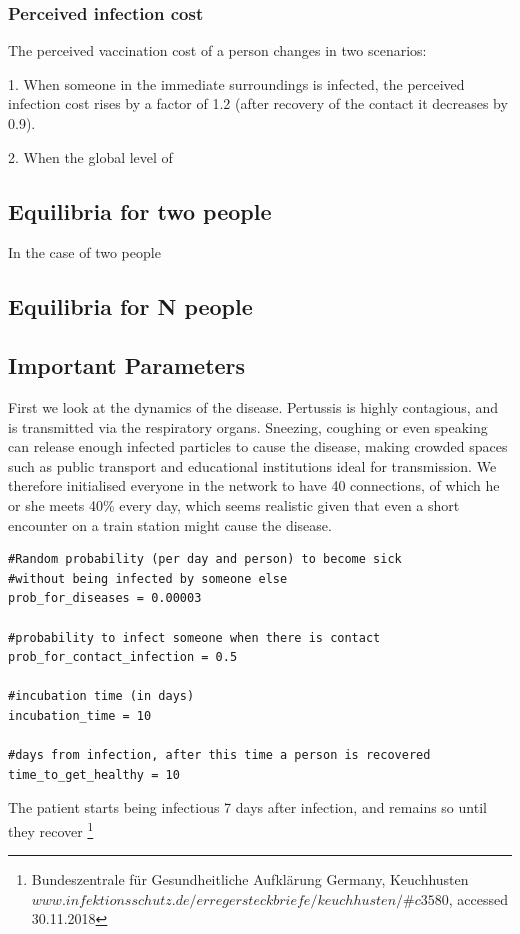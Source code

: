 \documentclass[11pt]{article}
\begin{document}
\subsubsection{Perceived infection cost}
The perceived vaccination cost of a person changes in two scenarios:

1. When someone in the immediate surroundings is infected, the perceived infection cost rises by a factor of 1.2 (after recovery of the contact it decreases by 0.9).

2. When the global level of 

\subsection{Equilibria for two people}
In the case of two people

\subsection{Equilibria for N people}


\subsection{Important Parameters}
First we look at the dynamics of the disease. Pertussis is highly contagious, and is transmitted via the respiratory organs. Sneezing, coughing or even speaking can release enough infected particles to cause the disease, making crowded spaces such as public transport and educational institutions ideal for transmission. We therefore initialised everyone in the network to have 40 connections, of which he or she meets 40\% every day, which seems realistic given that even a short encounter on a train station might cause the disease. 
\begin{lstlisting}
#Random probability (per day and person) to become sick 
#without being infected by someone else
prob_for_diseases = 0.00003 

#probability to infect someone when there is contact
prob_for_contact_infection = 0.5 

#incubation time (in days)
incubation_time = 10
 
#days from infection, after this time a person is recovered
time_to_get_healthy = 10 
\end{lstlisting}

The patient starts being infectious 7 days after infection, and remains so until they recover \footnote{Bundeszentrale für Gesundheitliche Aufklärung Germany, Keuchhusten \break
$www.infektionsschutz.de/erregersteckbriefe/keuchhusten/\#c3580$, accessed 30.11.2018}
\end{document}
